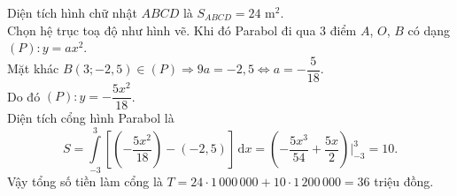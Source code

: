 \begin{bt}
{\begin{center}
		\end{center}
		Diện tích hình chữ nhật $ABCD$ là $S_{ABCD}=24 \text{~m}^2$.\\
		Chọn hệ trục toạ độ như hình vẽ. Khi đó Parabol đi qua $3$ điểm $A$, $O$, $B$ có dạng $(P)\colon y=ax^2$.\\
		Mặt khác $B(3;-2{,}5)\in (P)\Rightarrow 9a=-2{,}5\Leftrightarrow a=-\dfrac{5}{18}$.\\
		Do đó $(P)\colon y=-\dfrac{5x^2}{18}$.\\
		Diện tích cổng hình Parabol là $$S=\displaystyle\int\limits_{-3}^3 \left[ \left( -\dfrac{5x^2}{18}\right)-(-2{,}5)\right]  \mathrm{\,d}x=\left( -\dfrac{5x^3}{54}+\dfrac{5x}{2}\right) \bigg|_{-3}^3=10.$$
		Vậy tổng số tiền làm cổng là $T=24\cdot 1\,000\,000+10\cdot 1\,200\,000=36$ triệu đồng.
	}
\end{bt}

